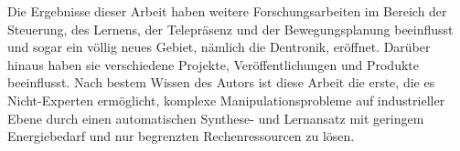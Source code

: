 Die Ergebnisse dieser Arbeit haben weitere Forschungsarbeiten im Bereich der Steuerung, des Lernens, der Telepr\"asenz und der Bewegungsplanung beeinflusst und sogar ein v\"ollig neues Gebiet, n\"amlich die Dentronik, er\"offnet. Dar\"uber hinaus haben sie verschiedene Projekte, Ver\"offentlichungen und Produkte beeinflusst.
Nach bestem Wissen des Autors ist diese Arbeit die erste, die es Nicht-Experten erm\"oglicht, komplexe Manipulationsprobleme auf industrieller Ebene durch einen automatischen Synthese- und Lernansatz mit geringem Energiebedarf und nur begrenzten Rechenressourcen zu l\"osen.